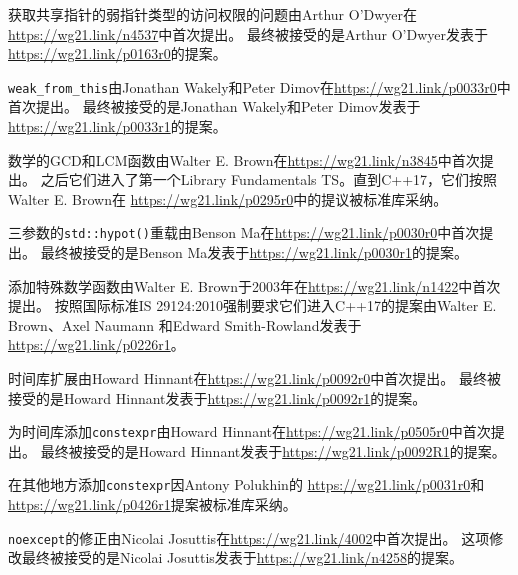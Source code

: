 获取共享指针的弱指针类型的访问权限的问题由Arthur O’Dwyer在\url{https://wg21.link/n4537}中首次提出。
最终被接受的是Arthur O’Dwyer发表于\url{https://wg21.link/p0163r0}的提案。

\texttt{weak\_from\_this}由Jonathan Wakely和Peter Dimov在\url{https://wg21.link/p0033r0}中首次提出。
最终被接受的是Jonathan Wakely和Peter Dimov发表于\url{https://wg21.link/p0033r1}的提案。

数学的GCD和LCM函数由Walter E. Brown在\url{https://wg21.link/n3845}中首次提出。
之后它们进入了第一个Library Fundamentals TS。直到C++17，它们按照Walter E. Brown在
\url{https://wg21.link/p0295r0}中的提议被标准库采纳。

三参数的\texttt{std::hypot()}重载由Benson Ma在\url{https://wg21.link/p0030r0}中首次提出。
最终被接受的是Benson Ma发表于\url{https://wg21.link/p0030r1}的提案。

添加特殊数学函数由Walter E. Brown于2003年在\url{https://wg21.link/n1422}中首次提出。
按照国际标准IS 29124:2010强制要求它们进入C++17的提案由Walter E. Brown、Axel Naumann
和Edward Smith-Rowland发表于\url{https://wg21.link/p0226r1}。

时间库扩展由Howard Hinnant在\url{https://wg21.link/p0092r0}中首次提出。
最终被接受的是Howard Hinnant发表于\url{https://wg21.link/p0092r1}的提案。

为时间库添加\texttt{constexpr}由Howard Hinnant在\url{https://wg21.link/p0505r0}中首次提出。
最终被接受的是Howard Hinnant发表于\url{https://wg21.link/p0092R1}的提案。

在其他地方添加\texttt{constexpr}因Antony Polukhin的
\url{https://wg21.link/p0031r0}和\url{https://wg21.link/p0426r1}提案被标准库采纳。

\texttt{noexcept}的修正由Nicolai Josuttis在\url{https://wg21.link/4002}中首次提出。
这项修改最终被接受的是Nicolai Josuttis发表于\url{https://wg21.link/n4258}的提案。

